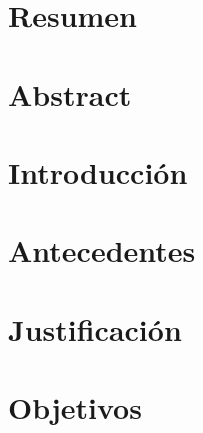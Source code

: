 \documentclass[11pt, letterpaper, twoside, openright]{report}
\newcommand{\defaultparformat}[1]{
	{\setlength{\parskip}{2ex}
     }
}
\begin{document}
	\chapter*{Resumen}
	\ifdefined\parpordefecto
		\defaultparformat{b-resumen}
	\else
		
	\fi
\fi

\ifdefined\CAPabstract
	\newpage
    \cleardoublepage{}
	\chapter*{Abstract}
	\ifdefined\parpordefecto
		\defaultparformat{c-abstract}
	\else
		
	\fi
\fi

\ifdefined\CAPintroduccion
	\newpage
	\cleardoublepage
	\setcounter{page}{1}
	\chapter{Introducción}
	\ifdefined\parpordefecto
		\defaultparformat{d-introduccion}
	\else
		
	\fi
\fi

\ifdefined\CAPantecedentes
	\newpage
	\chapter{Antecedentes}
	\ifdefined\parpordefecto
    	\defaultparformat{e-antecedentes}
    \else
    	
    \fi  
\fi

\ifdefined\CAPjustificacion
	\newpage
	\chapter{Justificación}
	\ifdefined\parpordefecto
		\defaultparformat{f-justificacion}
	\else
		
	\fi
\fi

\ifdefined\CAPobjetivos
	\newpage
	\chapter{Objetivos}
	\ifdefined\parpordefecto
		\defaultparformat{g-objetivos}
	\else
		
	\fi
\fi
\end{document}
